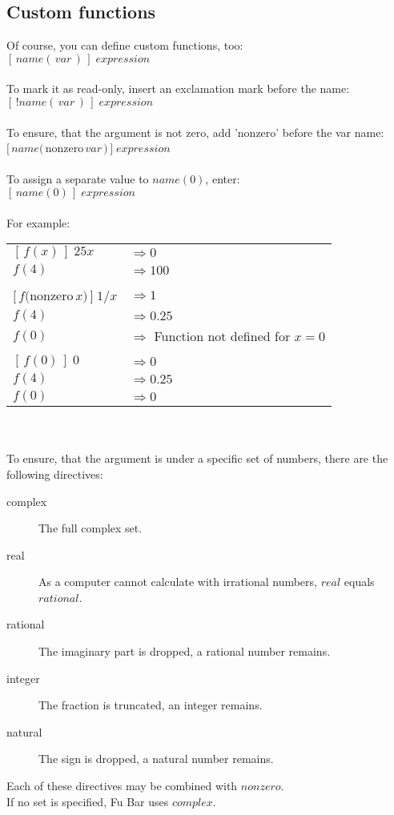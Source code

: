 \documentclass[12pt,a4paper]{article}
\begin{document}
	\subsection{Custom functions}
	
	Of course, you can define custom functions, too:\\
	$[\,name(\,var\,)\,]\;expression$\\\\
	To mark it as read-only, insert an exclamation mark before the name:\\
	$[\,!name(\,var\,)\,]\;expression$\\\\
	To ensure, that the argument is not zero, add 'nonzero' before the var name:\\
	$[\,name(\,$nonzero$\,var\,)\,]\;expression$\\\\
	To assign a separate value to $name(0)$, enter:\\
	$[\,name(0)\,]\;expression$\\\\
	For example:\\
	\begin{tabular}{ll}
	$[\,f(x)\,]\;25x$ & $\Rightarrow 0$\\
    $f(4)$& $\Rightarrow 100$\\
    \\
    $[\,f($nonzero$\,x)\,]\;1/x$ & $\Rightarrow 1$\\
    $f(4)$ & $\Rightarrow 0.25$\\
    $f(0)$ & $\Rightarrow$ Function not defined for $x=0$\\
    \\
    $[\,f(0)\,]\;0$ & $\Rightarrow 0$\\
    $f(4)$ & $\Rightarrow 0.25$\\
    $f(0)$ & $\Rightarrow 0$
	\end{tabular}\\\\
	To ensure, that the argument is under a specific set of numbers,
	there are the following directives:\\
	\begin{description}
	  \item[complex] The full complex set.
	  \item[real] As a computer cannot calculate with irrational numbers,
	              $real$ equals $rational$.
	  \item[rational] The imaginary part is dropped, a rational number remains.
	  \item[integer] The fraction is truncated, an integer remains.
	  \item[natural] The sign is dropped, a natural number remains.
	\end{description}
	Each of these directives may be combined with $nonzero$.\\
	If no set is specified, Fu Bar uses $complex$.
	
\end{document}
